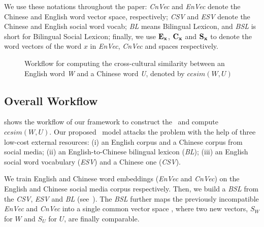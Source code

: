 {We use these notations throughout the paper: 
	\textit{CnVec} and \textit{EnVec} denote the Chinese and English word vector space, respectively; 
	\textit{CSV} and \textit{ESV} denote the Chinese and English social word vocab;
	\textit{BL} means Bilingual Lexicon, and \textit{BSL} is short for Bilingual Social Lexicon;
	finally, we use $\bf{E_x}$, $\bf{C_x}$ and $\bf{S_x}$ to denote the word vectors of 
	the word $x$ in \textit{EnVec}, \textit{CnVec} and \textit{\socvec} spaces
	respectively.}



\begin{figure}[t]
	\centering
	\caption{Workflow for computing the cross-cultural similarity between 
		an English word \textit{W} and a Chinese word \textit{U}, denoted by $ccsim(W, U)$}
	\label{fig:overview}
\end{figure}


\subsection{Overall Workflow}
\label{sec:flow}
 shows the workflow of our framework to construct the \textit{\socvec}~and compute $ccsim(W,U)$. 
Our proposed \textit{\socvec}~model attacks the problem with the help of three low-cost external resources: 
(i) an English corpus and a Chinese corpus from social media; (ii) an English-to-Chinese bilingual lexicon (\textit{BL});  
(iii) an English social word vocabulary (\textit{ESV}) and a Chinese one
(\textit{CSV}).

We train English and 
Chinese word embeddings (\textit{EnVec} and \textit{CnVec}) 
on the English and Chinese social media corpus respectively. 
Then, 
we build a \textit{BSL}
from the \textit{CSV}, \textit{ESV} and \textit{BL} (see~). 
The \textit{BSL} further maps the previously incompatible \textit{EnVec} and \textit{CnVec} 
into a single common vector space \textit{\socvec},
where two new vectors, $S_W$ for $W$ and $S_U$ for $U$,
are finally comparable.
%

